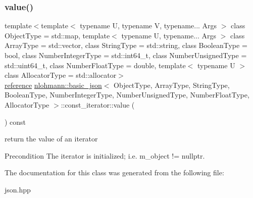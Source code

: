 \subsubsection{\texorpdfstring{value()}{value()}}
{\footnotesize\ttfamily template$<$template$<$ typename U, typename V, typename... Args $>$ class Object\+Type = std\+::map, template$<$ typename U, typename... Args $>$ class Array\+Type = std\+::vector, class String\+Type  = std\+::string, class Boolean\+Type  = bool, class Number\+Integer\+Type  = std\+::int64\+\_\+t, class Number\+Unsigned\+Type  = std\+::uint64\+\_\+t, class Number\+Float\+Type  = double, template$<$ typename U $>$ class Allocator\+Type = std\+::allocator$>$ \\
\hyperlink{classnlohmann_1_1basic__json_1_1const__iterator_aefd248cac6493eed1e6ff53ba6a63eb2}{reference} \hyperlink{classnlohmann_1_1basic__json}{nlohmann\+::basic\+\_\+json}$<$ Object\+Type, Array\+Type, String\+Type, Boolean\+Type, Number\+Integer\+Type, Number\+Unsigned\+Type, Number\+Float\+Type, Allocator\+Type $>$\+::const\+\_\+iterator\+::value (\begin{DoxyParamCaption}{ }\end{DoxyParamCaption}) const\hspace{0.3cm}{\ttfamily [inline]}}



return the value of an iterator 

\begin{DoxyPrecond}{Precondition}
The iterator is initialized; i.\+e. {\ttfamily m\+\_\+object != nullptr}. 
\end{DoxyPrecond}


The documentation for this class was generated from the following file\+:\begin{DoxyCompactItemize}
\item 
json.\+hpp\end{DoxyCompactItemize}
